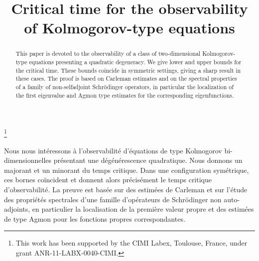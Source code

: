 \documentclass[JEP,XML,SOM,Unicode]{cedram}
\theoremstyle{plain}
\theoremstyle{definition}
\newcommand{\1}{\mathds 1}
\begin{document}
\frontmatter
\title{Critical time for the observability of Kolmogorov-type equations}

\author[\initial{J.} \lastname{Dardé}]{ }
\address{Institut de Mathématiques de Toulouse, UMR5219, Univ.\ de Toulouse, CNRS, UPS\\
F-31062 Toulouse Cedex 9, France}

\author[\initial{J.} \lastname{Royer}]{ }
\address{Institut de Mathématiques de Toulouse, UMR5219, Univ.\ de Toulouse, CNRS, UPS\\
F-31062 Toulouse Cedex 9, France}

\thanks{This work has been supported by the CIMI Labex, Toulouse, France, under grant ANR-11-LABX-0040-CIMI.}

\begin{abstract}
This paper is devoted to the observability of a class of two-di\-men\-sion\-al Kol\-mo\-go\-rov-type equations presenting a quadratic degeneracy. We give lower and upper bounds for the critical time. These bounds coincide in symmetric settings, giving a sharp result in these cases. The proof is based on Carleman estimates and on the spectral properties of a family of non-selfadjoint Schrödinger operators, in particular the localization of the first eigenvalue and Agmon type estimates for the corresponding eigenfunctions.
\end{abstract}





\begin{altabstract}
Nous nous intéressons à l'observabilité d'équations de type Kolmogorov bi-dimensionnelles présentant une dégénérescence quadratique. Nous donnons un majorant et un minorant du temps critique. Dans une configuration symétrique, ces bornes coïncident et donnent alors précisément le temps critique d'observabilité. La preuve est basée sur des estimées de Carleman et sur l'étude des propriétés spectrales d'une famille d'opérateurs de Schrödinger non auto-adjoints, en particulier la localisation de la première valeur propre et des estimées de type Agmon pour les fonctions propres correspondantes.
\end{altabstract}
\end{document}
